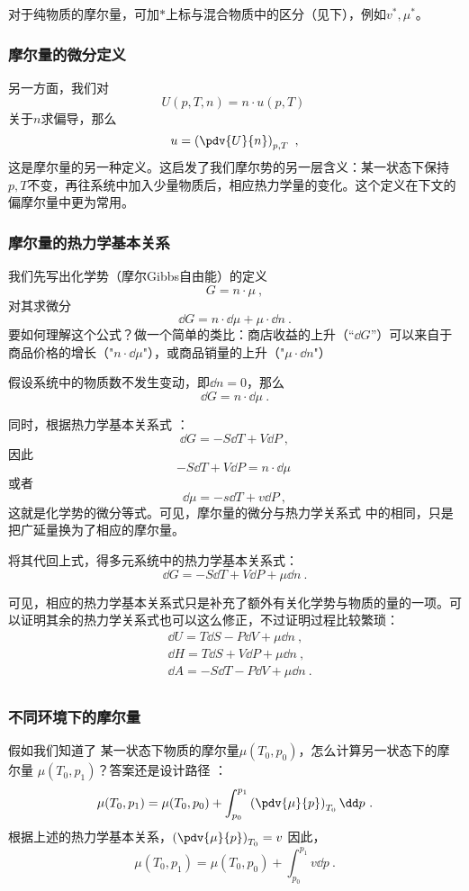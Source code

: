 对于纯物质的摩尔量，可加$*$上标与混合物质中的区分（见下），例如$v^*, \mu^*$。

\subsubsection{摩尔量的微分定义}
另一方面，我们对
$$U(p, T, n) = n \cdot u (p, T)~$$
关于$n$求偏导，那么
$$u = \left( \pdv{U}{n} \right)_{p,T}~,$$
这是摩尔量的另一种定义。这启发了我们摩尔势的另一层含义：某一状态下保持$p,T$不变，再往系统中加入少量物质后，相应热力学量的变化。这个定义在下文的偏摩尔量中更为常用。

\subsubsection{摩尔量的热力学基本关系}

我们先写出化学势（摩尔Gibbs自由能）的定义
$$G = n \cdot \mu~,$$
对其求微分
$$\dd G = n \cdot \dd \mu +  \mu \cdot\dd n~.$$
要如何理解这个公式？做一个简单的类比：商店收益的上升（“$\dd G$”）可以来自于商品价格的增长（"$n \cdot \dd \mu$"），或商品销量的上升（"$\mu \cdot \dd n$"）

假设系统中的物质数不发生变动，即$\dd n = 0$，那么
$$\dd G = n \cdot \dd \mu~.$$

同时，根据热力学基本关系式 ：
$$\dd G = -S \dd T + V \dd P~,$$
因此
$$-S \dd T + V \dd P = n \cdot \dd \mu~$$
或者
$$
\dd \mu = -s \dd T + v \dd P~,
$$
这就是化学势的微分等式。可见，摩尔量的微分与热力学关系式 中的相同，只是把广延量换为了相应的摩尔量。

将其代回上式，得多元系统中的热力学基本关系式：
$$\dd G = -S \dd T + V \dd P + \mu \dd n~.$$

可见，相应的热力学基本关系式只是补充了额外有关化学势与物质的量的一项。可以证明其余的热力学关系式也可以这么修正，不过证明过程比较繁琐：
$$
\begin{aligned}
&\dd U = T \dd S - P \dd V + \mu \dd n~,\\
&\dd H = T \dd S + V \dd P + \mu \dd n~,\\
&\dd A = -S \dd T - P \dd V + \mu \dd n~.\\
\end{aligned}
$$

\subsubsection{不同环境下的摩尔量}
假如我们知道了 某一状态下物质的摩尔量$\mu(T_0,p_0)$，怎么计算另一状态下的摩尔量 $\mu(T_0,p_1)$？答案还是设计路径 ：
$$\mu(T_0,p_1) = \mu(T_0,p_0) + \int_{p_0}^{p_1} \left( \pdv{\mu}{p} \right)_{T_0} \dd p~.$$
根据上述的热力学基本关系，$\left( \pdv{\mu}{p} \right)_{T_0} = v$
因此，$$\mu(T_0,p_1) = \mu(T_0,p_0) + \int_{p_0}^{p_1} v \dd p~.$$

